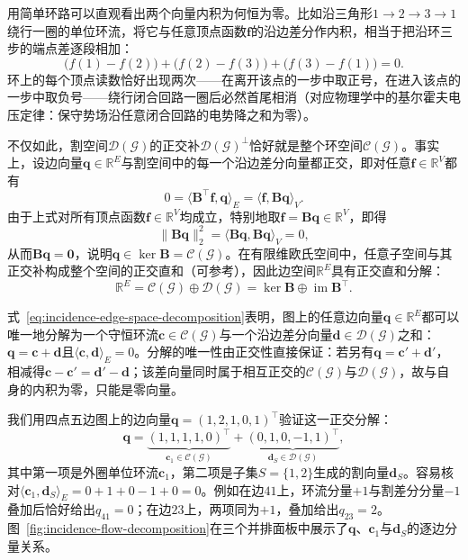 用简单环路可以直观看出两个向量内积为何恒为零。比如沿三角形$1\to2\to3\to1$绕行一圈的单位环流，将它与任意顶点函数$\bm{f}$的沿边差分作内积，相当于把沿环三步的端点差逐段相加：
\[
\bigl(f(1)-f(2)\bigr)+\bigl(f(2)-f(3)\bigr)+\bigl(f(3)-f(1)\bigr)=0.
\]
环上的每个顶点读数恰好出现两次——在离开该点的一步中取正号，在进入该点的一步中取负号——绕行闭合回路一圈后必然首尾相消（对应物理学中的基尔霍夫电压定律：保守势场沿任意闭合回路的电势降之和为零）。

不仅如此，割空间$\mathcal{D}(\mathcal{G})$的正交补$\mathcal{D}(\mathcal{G})^\perp$恰好就是整个环空间$\mathcal{C}(\mathcal{G})$。事实上，设边向量$\bm{q}\in\mathbb{R}^E$与割空间中的每一个沿边差分向量都正交，即对任意$\bm{f}\in\mathbb{R}^V$都有
\[
0=\langle\bm{B}^\top\bm{f},\bm{q}\rangle_E=\langle\bm{f},\bm{B}\bm{q}\rangle_V.
\]
由于上式对所有顶点函数$\bm{f}\in\mathbb{R}^V$均成立，特别地取$\bm{f}=\bm{B}\bm{q}\in\mathbb{R}^V$，即得
\[
\lVert\bm{B}\bm{q}\rVert_2^2=\langle\bm{B}\bm{q},\bm{B}\bm{q}\rangle_V=0,
\]
从而$\bm{B}\bm{q}=\bm{0}$，说明$\bm{q}\in\ker\bm{B}=\mathcal{C}(\mathcal{G})$。在有限维欧氏空间中，任意子空间与其正交补构成整个空间的正交直和（可参考），因此边空间$\mathbb{R}^E$具有正交直和分解：
\begin{equation}
\mathbb{R}^E=\mathcal{C}(\mathcal{G})\oplus\mathcal{D}(\mathcal{G})
=\ker\bm{B}\oplus\operatorname{im}\bm{B}^\top.
\label{eq:incidence-edge-space-decomposition}
\end{equation}

式~\eqref{eq:incidence-edge-space-decomposition}表明，图上的任意边向量$\bm{q}\in\mathbb{R}^E$都可以唯一地分解为一个守恒环流$\bm{c}\in\mathcal{C}(\mathcal{G})$与一个沿边差分向量$\bm{d}\in\mathcal{D}(\mathcal{G})$之和：$\bm{q}=\bm{c}+\bm{d}$且$\langle\bm{c},\bm{d}\rangle_E=0$。分解的唯一性由正交性直接保证：若另有$\bm{q}=\bm{c}'+\bm{d}'$，相减得$\bm{c}-\bm{c}'=\bm{d}'-\bm{d}$；该差向量同时属于相互正交的$\mathcal{C}(\mathcal{G})$与$\mathcal{D}(\mathcal{G})$，故与自身的内积为零，只能是零向量。

我们用四点五边图上的边向量$\bm{q}=(1,2,1,0,1)^\top$验证这一正交分解：
\[
\bm{q}=\underbrace{(1,1,1,1,0)^\top}_{\bm{c}_1\in\mathcal{C}(\mathcal{G})}
      +\underbrace{(0,1,0,-1,1)^\top}_{\bm{d}_S\in\mathcal{D}(\mathcal{G})},
\]
其中第一项是外圈单位环流$\bm{c}_1$，第二项是子集$S=\{1,2\}$生成的割向量$\bm{d}_S$。容易核对$\langle\bm{c}_1,\bm{d}_S\rangle_E=0+1+0-1+0=0$。例如在边$41$上，环流分量$+1$与割差分分量$-1$叠加后恰好给出$q_{41}=0$；在边$23$上，两项同为$+1$，叠加给出$q_{23}=2$。图~\ref{fig:incidence-flow-decomposition}在三个并排面板中展示了$\bm{q}$、$\bm{c}_1$与$\bm{d}_S$的逐边分量关系。

